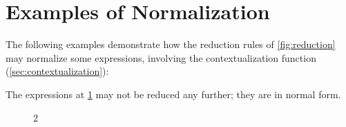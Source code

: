 
\newpage
\section{Examples of Normalization}
\label{app:normalization-examples}

\newcommand\phiExpression[1]{%
  \stepcounter{exmp}
  e_{\theexmp} = }

The following examples demonstrate how the reduction rules of \cref{fig:reduction} may normalize
some expressions, involving the contextualization function (\cref{sec:contextualization}):



The expressions at \cref{fig:normals} may not be reduced any further;
  they are in normal form.

\begin{figure}
\begin{mdframed}
\begin{multicols}{2}

\end{multicols}
\end{mdframed}
\label{fig:normals}
\end{figure}
